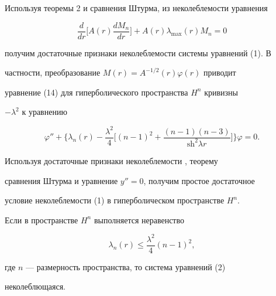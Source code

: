  


Используя теоремы 2 и сравнения Штурма, из неколеблемости уравнения 


\begin{equation} 


\frac{d}{dr}\bigg[A(r)\frac{dM_n}{dr}\bigg]+ 


A(r)\lambda_{\max}(r)M_n=0 


\end{equation} 


получим достаточные признаки неколеблемости системы уравнений (1). В 


частности, преобразование $M(r)=A^{-1/2}(r)\varphi(r)$ приводит 


уравнение (14) для гиперболического пространства $H^n$ кривизны 


$-\lambda^2$ к уравнению 


\begin{equation} 


\varphi''+\bigg\{\lambda_n(r)-\frac{\lambda^2}{4}\bigg[ 


(n-1)^2+\frac{(n-1)(n-3)}{\text{sh}^2\lambda r} 


\bigg]\bigg\}\varphi=0. 


\end{equation} 


 


Используя достаточные признаки неколеблемости \cite{2}, теорему 


сравнения Штурма и уравнение $y''=0$, получим простое достаточное 


условие неколеблемости (1) в гиперболическом пространстве $H^n$. 


 


\begin{cor} 


Если в пространстве $H^n$ выполняется неравенство 


\begin{equation} 


\lambda_n(r)\le\frac{\lambda^2}{4}(n-1)^2, 


\end{equation} 


где $n$ --- размерность пространства, то система уравнений (2) 


неколеблющаяся. 


\end{cor} 



